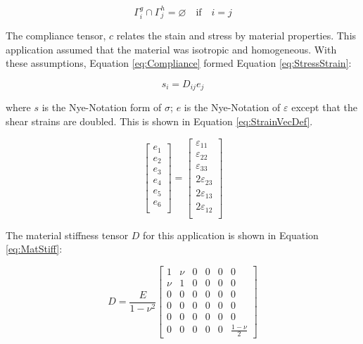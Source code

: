 \documentclass[a4paper, 12pt]{article}
\begin{document}
\begin{equation} \label{eq:DNconf}
\Gamma^{g}_{i} \cap \Gamma^{h}_{j} = \varnothing \quad \text{if} \quad i=j
\end{equation}

The compliance tensor, $c$ relates the stain and stress by
material properties. This application assumed that the material
was isotropic and homogeneous. With these assumptions,
Equation \ref{eq:Compliance} formed Equation \ref{eq:StressStrain}:

\begin{equation} \label{eq:StressStrain}
s_{i} = D_{ij} e_{j}
\end{equation}

\noindent
where $s$ is the Nye-Notation form of $\sigma$; $e$ is the Nye-Notation
of $\varepsilon$ except that the shear strains are doubled. This
is shown in Equation \ref{eq:StrainVecDef}.

\begin{equation} \label{eq:StrainVecDef}
  \begin{bmatrix}
    e_1 \\
    e_2 \\
    e_3 \\
    e_4 \\
    e_5 \\
    e_6 \\
  \end{bmatrix}
  =
  \begin{bmatrix}
    \varepsilon_{11} \\
    \varepsilon_{22} \\
    \varepsilon_{33} \\

    2 \varepsilon_{23} \\
    2 \varepsilon_{13} \\
    2 \varepsilon_{12} \\
  \end{bmatrix}
\end{equation}

\noindent
The material stiffness tensor $D$ for this application
is shown in Equation \ref{eq:MatStiff}:

\begin{equation} \label{eq:MatStiff}
  D = \frac{E}{1-\nu^2}
  \begin{bmatrix}
  1 & \nu & 0 & 0 & 0 & 0 \\
  \nu & 1 & 0 & 0 & 0 & 0 \\
  0 & 0 & 0  & 0 & 0 & 0 \\
  0 & 0 & 0 & 0 & 0 & 0 \\
  0 & 0 & 0 & 0 & 0 & 0 \\
  0 & 0 & 0 & 0 & 0 & \frac{1-\nu}{2}
  \end{bmatrix}
\end{equation}
\end{document}
